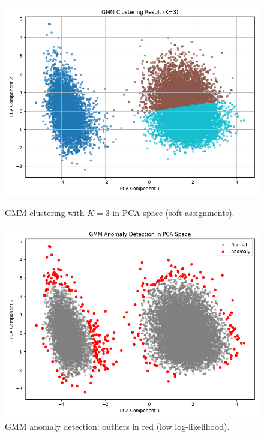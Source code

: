 \documentclass[12pt]{article}
\begin{document}
\begin{figure}[H]
    \centering
    \begin{minipage}[t]{0.48\textwidth}
        \includegraphics[width=\textwidth]{figures/gmm_clustered_pca_k3.png}
        \caption{GMM clustering with $K=3$ in PCA space (soft assignments).}
        \label{G}
    \end{minipage}
    \hfill
    \begin{minipage}[t]{0.48\textwidth}
        \includegraphics[width=\textwidth]{figures/gmm_anomaly_scatter.png}
        \caption{GMM anomaly detection: outliers in red (low log-likelihood).}
        \label{I}
    \end{minipage}
\end{figure}
\end{document}
